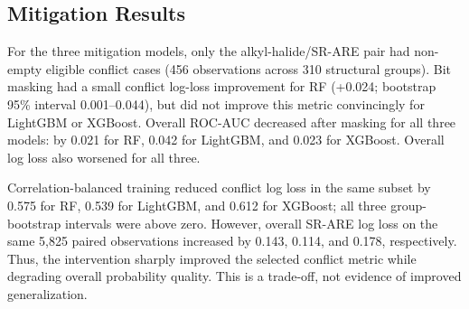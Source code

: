 \documentclass[conference]{IEEEtran}
\begin{document}
\begin{table}[t]
\centering
\caption{Alkyl-halide/SR-ARE comparison across five models under the notebook's conflict rule. Lower log loss is better. Full-versus-motif-only improvement equals motif-only conflict log loss minus full-model conflict log loss.}
\label{tab:conflict}
\footnotesize
{}
\end{table}

\subsection{Mitigation Results}
For the three mitigation models, only the alkyl-halide/SR-ARE pair had non-empty eligible conflict cases (456 observations across 310 structural groups). Bit masking had a small conflict log-loss improvement for RF (+0.024; bootstrap 95\% interval 0.001--0.044), but did not improve this metric convincingly for LightGBM or XGBoost. Overall ROC-AUC decreased after masking for all three models: by 0.021 for RF, 0.042 for LightGBM, and 0.023 for XGBoost. Overall log loss also worsened for all three.

Correlation-balanced training reduced conflict log loss in the same subset by 0.575 for RF, 0.539 for LightGBM, and 0.612 for XGBoost; all three group-bootstrap intervals were above zero. However, overall SR-ARE log loss on the same 5,825 paired observations increased by 0.143, 0.114, and 0.178, respectively. Thus, the intervention sharply improved the selected conflict metric while degrading overall probability quality. This is a trade-off, not evidence of improved generalization.
\end{document}
